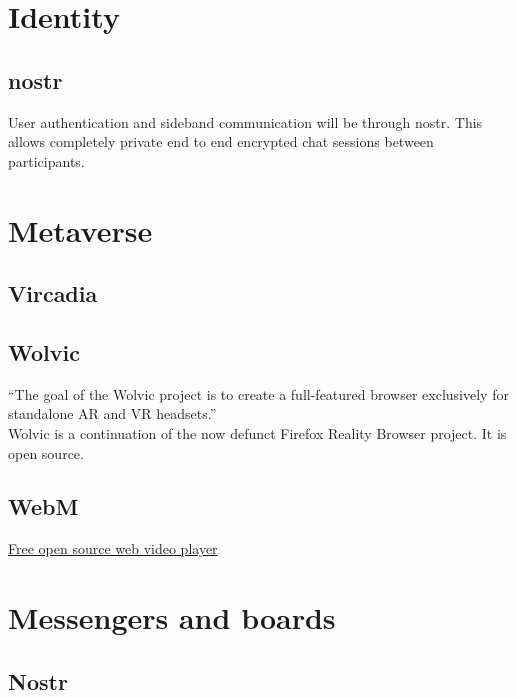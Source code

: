 



\section{Identity}
\subsection{nostr}
User authentication and sideband communication will be through nostr. This allows completely private end to end encrypted chat sessions between participants.
\section{Metaverse}
\subsection{Vircadia}
\subsection{Wolvic}
``The goal of the Wolvic project is to create a full-featured browser exclusively for standalone AR and VR headsets.''\\
Wolvic is a continuation of the now defunct Firefox Reality Browser project. It is open source.
\subsection{WebM}
\href{https://www.webmproject.org/about/}{Free open source web video player}	
\section{Messengers and boards}
\subsection{Nostr}

